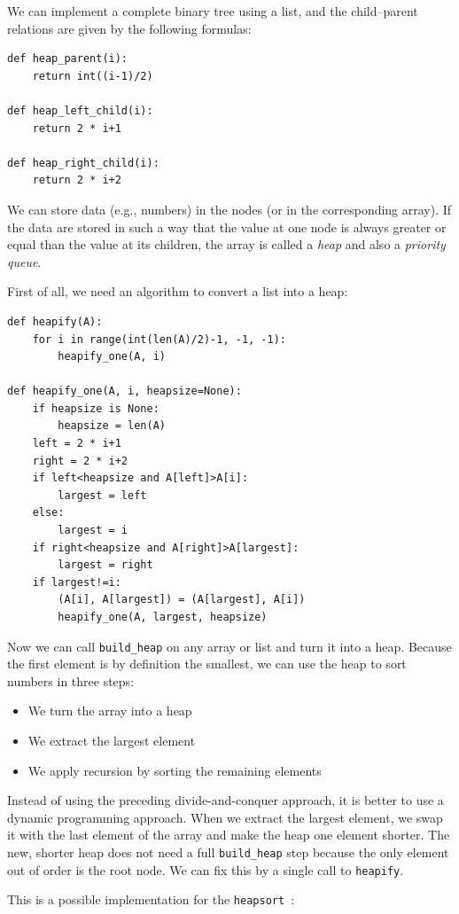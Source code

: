 \documentclass[justified, sixbynine]{tufte-book}
\def\ft{\small\tt}
\theoremstyle{plain}%
\newtheorem * {corollary}{Corollary}
\theoremstyle{definition}
\theoremstyle{remark}
\newtheorem * {remark}{Remark}
\newtheorem * {note}{Note}
\begin{document}
\begin{fullwidth}
We can implement a complete binary tree using a list, and the child--parent relations are given by the following formulas:
\begin{lstlisting}
def heap_parent(i):
    return int((i-1)/2)

def heap_left_child(i):
    return 2 * i+1

def heap_right_child(i):
    return 2 * i+2
\end{lstlisting}

We can store data (e.g., numbers) in the nodes (or in the corresponding array). If the data are
stored in such a way that the value at one node is always greater or equal than the value at its children, the array is called a {\it heap} and also a {\it priority queue}.

First of all, we need an algorithm to convert a list into a heap:

\begin{lstlisting}
def heapify(A):
    for i in range(int(len(A)/2)-1, -1, -1):
        heapify_one(A, i)

def heapify_one(A, i, heapsize=None):
    if heapsize is None:
        heapsize = len(A)
    left = 2 * i+1
    right = 2 * i+2
    if left<heapsize and A[left]>A[i]:
        largest = left
    else:
        largest = i
    if right<heapsize and A[right]>A[largest]:
        largest = right
    if largest!=i:
        (A[i], A[largest]) = (A[largest], A[i])
        heapify_one(A, largest, heapsize)
\end{lstlisting}

Now we can call {\ft build\_heap} on any array or list and turn it into a heap.
Because the first element is by definition the smallest, we can use the heap to sort numbers in three steps:
\begin{itemize}
\item We turn the array into a heap
\item We extract the largest element
\item We apply recursion by sorting the remaining elements
\end{itemize}
Instead of using the preceding divide-and-conquer approach, it is better to use a dynamic programming approach. When we extract the largest element, we swap it with the last element of the array and make the heap one element shorter. The new, shorter heap does not need a full {\ft build\_heap} step because the only element out of order is the root node. We can fix this by a single call to {\ft heapify}.

This is a possible implementation for the {\ft heapsort}~\cite{heapsort}:


\end{fullwidth}
\end{document}
